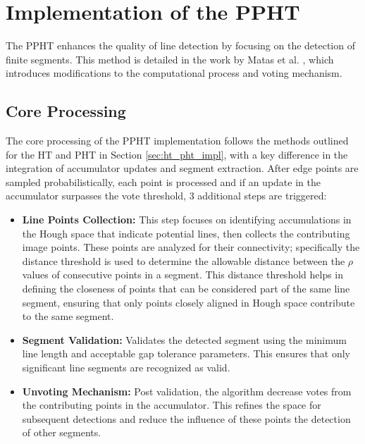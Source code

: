 \documentclass[conference]{IEEEtran}
\begin{document}
\section{Implementation of the PPHT}
\label{sec:ppht_impl}
    
    The PPHT enhances the quality of line detection by focusing on the detection of finite segments. This method is detailed in the work by Matas et al. \cite{PPHT}, which introduces modifications to the computational process and voting mechanism.
    
    \subsection{Core Processing}
    \label{subsec:ppht_core_processing}
    
        The core processing of the PPHT implementation follows the methods outlined for the HT and PHT in Section \ref{sec:ht_pht_impl}, with a key difference in the integration of accumulator updates and segment extraction. After edge points are sampled probabilistically, each point is processed and if an update in the accumulator surpasses the vote threshold, 3 additional steps are triggered:

    
        \begin{itemize}
            \item \textbf{Line Points Collection:} This step focuses on identifying accumulations in the Hough space that indicate potential lines, then collects the contributing image points. These points are analyzed for their connectivity; specifically the distance threshold is used to determine the allowable distance between the $\rho$ values of consecutive points in a segment. This distance threshold helps in defining the closeness of points that can be considered part of the same line segment, ensuring that only points closely aligned in Hough space contribute to the same segment.
        
            \item \textbf{Segment Validation:} Validates the detected segment using the minimum line length and acceptable gap tolerance parameters. This ensures that only significant line segments are recognized as valid.
            
            \item \textbf{Unvoting Mechanism:} Post validation, the algorithm decrease votes from the contributing points in the accumulator. This refines the space for subsequent detections and reduce the influence of these points the detection of other segments.
        \end{itemize}
    
\end{document}
